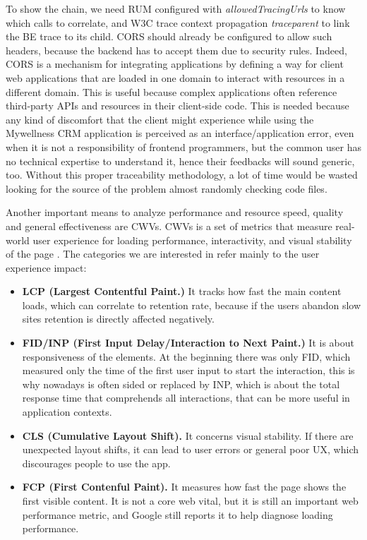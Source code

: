 \documentclass[12pt,a4paper,openright,twoside]{book}
\begin{document}
To show the chain, we need RUM configured with \textit{allowedTracingUrls} to know which calls to correlate, and W3C trace context propagation \textit{traceparent} to link the BE trace to its child. \ac{CORS} should already be configured to allow such headers, because the backend has to accept them due to security rules. Indeed, \ac{CORS} \cite{CORS} is a mechanism for integrating applications by defining a way for client web applications that are loaded in one domain to interact with resources in a different domain. This is useful because complex applications often reference third-party APIs and resources in their client-side code. 
This is needed because any kind of discomfort that the client might experience while using the Mywellness CRM application is perceived as an interface/application error, even when it is not a responsibility of frontend programmers, but the common user has no technical expertise to understand it, hence their feedbacks will sound generic, too. Without this proper traceability methodology, a lot of time would be wasted looking for the source of the problem almost randomly checking code files. 

Another important means to analyze performance and resource speed, quality and general effectiveness are \acp{CWV}. \acp{CWV} is a set of metrics that measure real-world user experience for loading performance, interactivity, and visual stability of the page \cite{CWV}. The categories we are interested in refer mainly to the user experience impact: 
\begin{itemize}
    \item \textbf{LCP (Largest Contentful Paint.)} It tracks how fast the main content loads, which can correlate to retention rate, because if the users abandon slow sites retention is directly affected negatively. 
    \item \textbf{FID/INP (First Input Delay/Interaction to Next Paint.)} It is about responsiveness of the elements. At the beginning there was only FID, which measured only the time of the first user input to start the interaction, this is why nowadays is often sided or replaced by INP, which is about the total response time that comprehends all interactions, that can be more useful in application contexts. 
    \item \textbf{CLS (Cumulative Layout Shift).} It concerns visual stability. If there are unexpected layout shifts, it can lead to user errors or general poor \ac{UX}, which discourages people to use the app. 
    \item \textbf{FCP (First Contenful Paint).} It measures how fast the page shows the first visible content. It is not a core web vital, but it is still an important web performance metric, and Google still reports it to help diagnose loading performance. 
\end{itemize}
\end{document}
